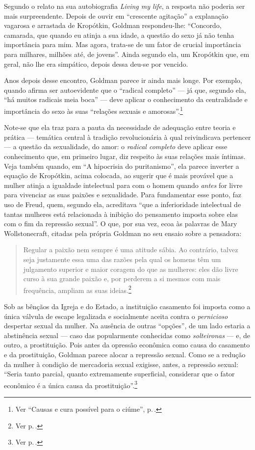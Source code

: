 Segundo o relato na sua
autobiografia \emph{Living my life}, a resposta não poderia ser mais
surpreendente. Depois de ouvir em ``crescente agitação'' a explanação
vagarosa e arrastada de Kropótkin, Goldman respondeu-lhe: ``Concordo,
camarada, que quando eu atinja a sua idade, a questão do sexo já não
tenha importância para mim. Mas agora, trata-se de um fator de
crucial importância para milhares, milhões até, de jovens''. Ainda
segundo ela, um Kropótkin que, em geral, não lhe era simpático, depois
dessa deu-se por vencido.

Anos depois desse encontro, Goldman parece
ir ainda mais longe. Por exemplo, quando afirma
ser autoevidente que o ``radical completo'' ---
já que, segundo ela, ``há muitos radicais meia boca'' --- deve aplicar o
conhecimento da centralidade e importância do sexo às suas ``relações
sexuais e amorosas''.\footnote{Ver ``Causas e cura
possível para o ciúme'', p.\,\pageref{radical}.}

Note-se que ela traz para a pauta da
necessidade de adequação entre teoria e prática --- temática central à
tradição revolucionária à qual reivindicava pertencer --- a questão
da sexualidade, do amor: o \emph{radical completo} deve aplicar esse
conhecimento que, em primeiro lugar, diz respeito às suas relações mais
íntimas. Veja também quando, em ``A hipocrisia do puritanismo'', ela
parece inverter a equação de Kropótkin, acima colocada, ao sugerir que é
mais provável que a mulher atinja a igualdade intelectual para com o
homem quando \emph{antes} for livre para vivenciar as suas paixões e
sexualidade. Para fundamentar esse ponto, faz uso de Freud, quem,
segundo ela, acreditava ``que a inferioridade intelectual de tantas
mulheres está relacionada à inibição do pensamento imposta sobre elas
com o fim da repressão sexual''. O que, por sua vez, ecoa às palavras de
Mary Wollstonecraft, citadas pela própria Goldman no seu ensaio sobre a
pensadora:

\begin{quote}
Regular a paixão nem sempre é uma atitude sábia. Ao contrário, talvez
seja justamente essa uma das razões pela qual os homens têm um
julgamento superior e maior coragem do que as mulheres: eles dão livre
curso à sua grande paixão e, por perderem a si mesmos com mais
frequência, ampliam as suas ideias.\footnote{Ver p.\,\pageref{regular}.}
\end{quote}

Sob as bênçãos da Igreja e do Estado, a instituição casamento foi
imposta como a única válvula de escape legalizada e socialmente aceita
contra o \emph{pernicioso} despertar sexual da mulher. Na ausência de
outras ``opções'', de um lado estaria a abstinência sexual --- caso
das popularmente conhecidas como \textit{solteironas} --- e, de outro, a
prostituição. Pois antes da opressão econômica como causa do casamento e
da prostituição, Goldman parece alocar a repressão sexual. Como se a
redução da mulher à condição de mercadoria sexual exigisse,
antes, a repressão sexual: ``Seria tanto parcial, quanto
extremamente superficial, considerar que o fator econômico é a única
causa da prostituição''.\footnote{Ver p.\,\pageref{parcial}.}

